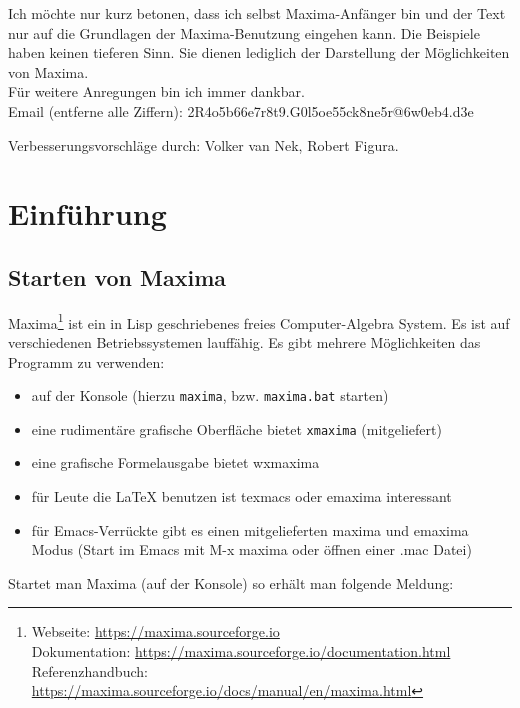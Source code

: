 \documentclass[12pt]{scrartcl}
\begin{document}
\vspace{1cm}

Ich möchte nur kurz betonen, dass ich selbst Maxima-Anfänger bin und der Text nur auf die Grundlagen der Maxima-Benutzung eingehen kann. Die Beispiele haben keinen tieferen Sinn. Sie dienen lediglich der Darstellung der Möglichkeiten von Maxima.\\
Für weitere Anregungen bin ich immer dankbar\@.\\
Email (entferne alle Ziffern): 2R4o5b66e7r8t9.G0l5oe55ck8ne5r@6w0eb4.d3e

\vspace{1cm}
Verbesserungsvorschläge durch: Volker van Nek, Robert Figura.

\newpage
\section{Einführung}

\subsection{Starten von Maxima}

Maxima\footnote{Webseite: \url{https://maxima.sourceforge.io} \\
Dokumentation: \url{https://maxima.sourceforge.io/documentation.html} \\
Referenzhandbuch: \url{https://maxima.sourceforge.io/docs/manual/en/maxima.html}}
ist ein in Lisp geschriebenes freies Computer-Algebra System. Es ist
auf verschiedenen Betriebssystemen lauffähig.
Es gibt mehrere Möglichkeiten das Programm zu verwenden:

\begin{itemize}
\item auf der Konsole (hierzu \texttt{maxima}, bzw. \texttt{maxima.bat} starten)
\item eine rudimentäre grafische Oberfläche bietet \texttt{xmaxima} (mitgeliefert)
\item eine grafische Formelausgabe bietet wxmaxima
\item für Leute die \LaTeX{} benutzen ist texmacs oder emaxima interessant
\item für Emacs-Verrückte gibt es einen mitgelieferten maxima und
  emaxima Modus (Start im Emacs mit M-x maxima oder öffnen einer {.mac} Datei)
\end{itemize}

Startet man Maxima (auf der Konsole) so erhält man folgende Meldung:
\end{document}
